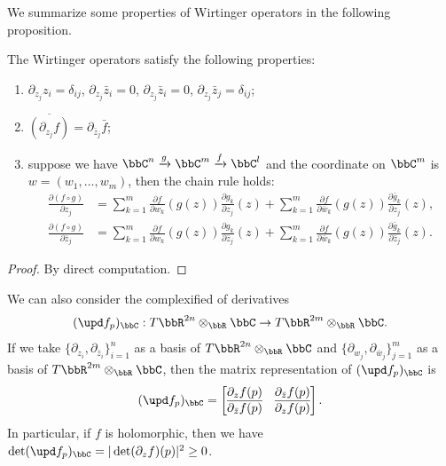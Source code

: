 We summarize some properties of Wirtinger operators in the following proposition.
\begin{proposition}\label{prop:properties_of_Wirtinger_operators}
	The Wirtinger operators satisfy the following properties:
	\begin{enumerate}
		\item \(\partial_{z_j} z_i = \delta_{ij}\), \(\partial_{z_j} \bar{z}_i = 0\), \(\partial_{z_j} \bar{z}_i = 0\), \(\partial_{z_j} \bar{z}_j = \delta_{ij}\);
		\item \(\overline{\left( \partial_{z_j} f \right)} = \partial_{\bar{z}_j} \bar{f}\);
		\item suppose we have \(\bbC^n \xrightarrow{g} \bbC^m \xrightarrow{f} \bbC^l\) and the coordinate on \(\bbC^m\) is \(w = (w_1, \ldots, w_m)\), then the chain rule holds:
		      \begin{align*}
			      \frac{\partial (f \circ g)}{\partial z_j}       & = \sum_{k=1}^m \frac{\partial f}{\partial w_k}(g(z)) \frac{\partial g_k}{\partial z_j}(z) + \sum_{k=1}^m \frac{\partial f}{\partial \bar{w}_k}(g(z)) \frac{\partial \bar{g}_k}{\partial z_j}(z),             \\
			      \frac{\partial (f \circ g)}{\partial \bar{z}_j} & = \sum_{k=1}^m \frac{\partial f}{\partial w_k}(g(z)) \frac{\partial g_k}{\partial \bar{z}_j}(z) + \sum_{k=1}^m \frac{\partial f}{\partial \bar{w}_k}(g(z)) \frac{\partial \bar{g}_k}{\partial \bar{z}_j}(z).
		      \end{align*}
	\end{enumerate}
\end{proposition}
\begin{proof}
	By direct computation.
\end{proof}

We can also consider the complexified of derivatives
\[ (\upd f_p)_\bbC: T\bbR^{2n} \otimes_\bbR \bbC \to T\bbR^{2m} \otimes_\bbR \bbC. \]
If we take \(\{\partial_{z_i}, \partial_{\bar{z}_i}\}_{i=1}^n\) as a basis of \(T\bbR^{2n} \otimes_\bbR \bbC\) and \(\{\partial_{w_j}, \partial_{\bar{w}_j}\}_{j=1}^m\) as a basis of \(T\bbR^{2m} \otimes_\bbR \bbC\),
then the matrix representation of \((\upd f_p)_\bbC\) is
\[ (\upd f_p)_\bbC = \begin{bmatrix}
		\partial_z f(p)                    & \partial_{\bar{z}} f(p)    \\
		\overline{\partial_{\bar{z}} f(p)} & \overline{\partial_z f(p)}
	\end{bmatrix}. \]
In particular, if \(f\) is holomorphic, then we have \(\det (\upd f_p)_\bbC = |\det(\partial_z f)(p)|^2 \geq 0\).

